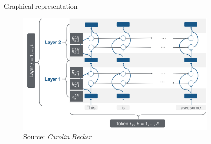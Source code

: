 
\begin{vbframe}{Graphical representation}

\vfill
			
	\begin{figure}
		\centering
		\includegraphics[width = 10cm]{figure/elmo-pretrained-bilm-2}\\ 
		\footnotesize{Source:} \href{https://slds-lmu.github.io/seminar_nlp_ss20/transfer-learning-for-nlp-i.html}{\footnotesize \it Carolin Becker}
	\end{figure}

\vfill

\end{vbframe}


